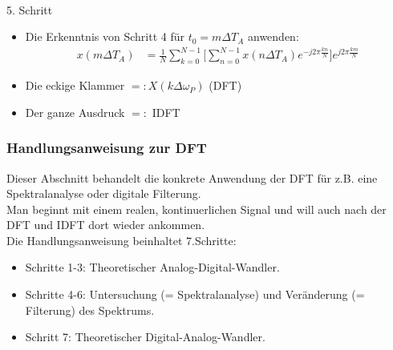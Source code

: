 \documentclass[12pt,a4paper]{scrartcl}
\begin{document}
\noindent \\ 5. Schritt
 \begin{itemize}
  \item Die Erkenntnis von Schritt 4 für $t_0 = m\Delta T_A$ anwenden: 
  \begin{equation}
    \label{eq:21}
    \begin{split}
      x(m\Delta T_A) &= \frac{1}{N} \sum_{k = 0}^{N -1} \Bigg[ \sum_{n = 0}^{N -1}  x(n \Delta T_A) e^{- j 2\pi \frac{k n}{N}} \Bigg] e^{j2\pi \frac{km}{N} }
    \end{split}
  \end{equation}
  \item Die eckige Klammer $ =: X(k\Delta \omega_P)$ (DFT)
  \item Der ganze Ausdruck $ =:$ IDFT
\end{itemize}


\subsubsection{Handlungsanweisung zur DFT}
Dieser Abschnitt behandelt die konkrete Anwendung der DFT für z.B. eine Spektralanalyse oder digitale Filterung. \\
Man beginnt mit einem realen, kontinuerlichen Signal und will auch nach der DFT und IDFT dort wieder ankommen. \\

\noindent   Die Handlungsanweisung beinhaltet 7.Schritte:
 \begin{itemize}
   \item Schritte 1-3: Theoretischer Analog-Digital-Wandler.
   \item Schritte 4-6: Untersuchung (= Spektralanalyse) und Veränderung (= Filterung) des Spektrums. 
   \item Schritt 7: Theoretischer Digital-Analog-Wandler.
 \end{itemize}
\end{document}
